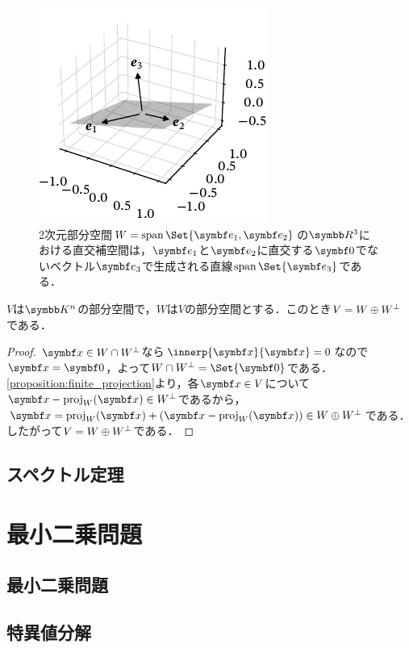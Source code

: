 \documentclass[../../main]{subfiles}
\begin{document}
\begin{figure}[htbp]
  \centering
  \includegraphics{orthogonal_complement.pdf}
  \caption{2次元部分空間\(W=\spannedby\Set{\vect{e}_1,\vect{e}_2}\)の\(\numset{R}^3\)における直交補空間は，\(\vect{e}_1\)と\(\vect{e}_2\)に直交する\(\zvec\)でないベクトル\(\vect{e}_3\)で生成される直線\(\spannedby\Set{\vect{e}_3}\)である．}
\end{figure}

\begin{proposition}{}{}
  \(V\)は\(\numset{K}^n\)の部分空間で，\(W\)は\(V\)の部分空間とする．このとき\(V=W\oplus W^{\mathord{\perp}}\)である．
\end{proposition}

\begin{proof}
  \(\vect{x}\in W\cap\pcomp{W}\)なら\(\innerp{\vect{x}}{\vect{x}}=0\)なので\(\vect{x}=\zvec\)，よって\(W\cap\pcomp{W}=\Set{\zvec}\)である．
  \cref{proposition:finite_projection}より，各\(\vect{x}\in V\)について\(\vect{x}-\proj_W(\vect{x})\in\pcomp{W}\)であるから，
  \(\vect{x}=\proj_W(\vect{x})+(\vect{x}-\proj_W(\vect{x}))\in W\oplus\pcomp{W}\)である．したがって\(V=W\oplus W^{\mathord{\perp}}\)である．
\end{proof}

\subsection{スペクトル定理}

\section{最小二乗問題}

\subsection{最小二乗問題}
\subsection{特異値分解}
\end{document}
